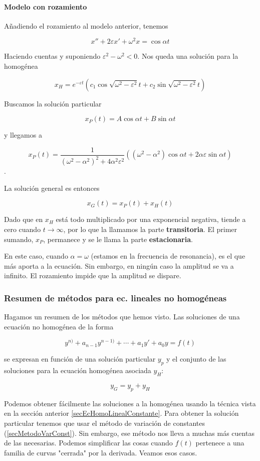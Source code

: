 \documentclass[nochap]{apuntes}
\begin{document}
\paragraph{Modelo con rozamiento}

Añadiendo el rozamiento al modelo anterior, tenemos

\[ x''+2εx'+ω^2x = \cos αt \]

Haciendo cuentas y suponiendo $ε^2-ω^2<0$. Nos queda una solución para la homogénea

\[ x_H = e^{-εt}\left(c_1 \cos \sqrt{ω^2-ε^2}t + c_2 \sin \sqrt{ω^2-ε^2}t\right) \]

Buscamos la solución particular

\[ x_P (t) = A\cos αt + B\sin αt \]

y llegamos a 

\[ x_P(t) = \frac{1}{(ω^2-α^2)^2 + 4α^2ε^2}\left((ω^2-α^2)\cos αt + 2αε \sin αt \right) \].

La solución general es entonces

\[ x_G(t) = x_P(t) + x_H(t) \]

Dado que en $x_H$ está todo multiplicado por una exponencial negativa, tiende a cero cuando $t\to ∞$, por lo que la llamamos la parte \textbf{transitoria}. El primer sumando, $x_P$, permanece y se le llama la parte \textbf{estacionaria}.

En este caso, cuando $α=ω$ (estamos en la frecuencia de resonancia), es el que más aporta a la ecuación. Sin embargo, en ningún caso la amplitud se va a infinito. El rozamiento impide que la amplitud se dispare.

\subsubsection{Resumen de métodos para ec. lineales no homogéneas}

Hagamos un resumen de los métodos que hemos visto. Las soluciones de una ecuación no homogénea de la forma

\[ y^{n)} + a_{n-1}y^{n-1)} + \dotsb + a_1y'+a_0y = f(t) \]

se expresan en función de una solución particular $y_p$ y el conjunto de las soluciones para la ecuación homogénea asociada $y_H$:

\[ y_G = y_p + y_H \]

Podemos obtener fácilmente las soluciones a la homogénea usando la técnica vista en la sección anterior \eqref{secEcHomoLinealConstante}. Para obtener la solución particular tenemos que usar el método de variación de constantes (\ref{secMetodoVarConst}). Sin embargo, ese método nos lleva a muchas más cuentas de las necesarias. Podemos simplificar las cosas cuando $f(t)$ pertenece a una familia de curvas "cerrada" por la derivada. Veamos esos casos.
\end{document}
